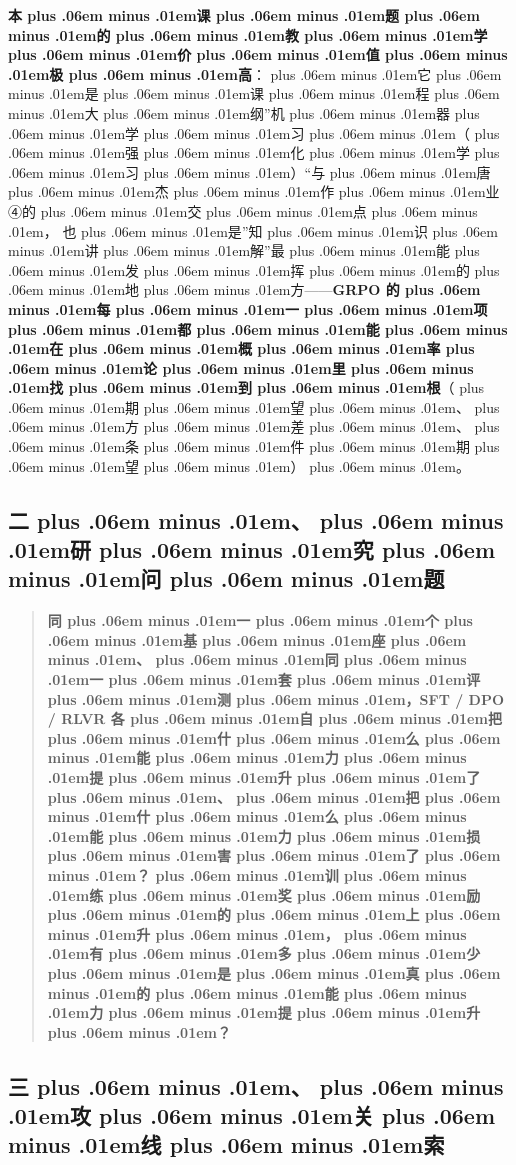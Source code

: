 \documentclass[
]{article}
\def\zh#1{{\zhfont #1}}
\def\sym#1{{\symfont #1}}
\def\zhglue{\hskip0pt plus .06em minus .01em}
\begin{document}
\textbf{\zh{本\zhglue 课\zhglue 题\zhglue 的\zhglue 教\zhglue 学\zhglue 价\zhglue 值\zhglue 极\zhglue 高}}\zh{：\zhglue 它\zhglue 是\zhglue 课\zhglue 程\zhglue 大\zhglue 纲}''\zh{机\zhglue 器\zhglue 学\zhglue 习\zhglue （\zhglue 强\zhglue 化\zhglue 学\zhglue 习\zhglue ）}``\zh{与\zhglue 唐\zhglue 杰\zhglue 作\zhglue 业}\sym{④}\zh{的\zhglue 交\zhglue 点\zhglue ，} \zh{也\zhglue 是}''\zh{知\zhglue 识\zhglue 讲\zhglue 解}''\zh{最\zhglue 能\zhglue 发\zhglue 挥\zhglue 的\zhglue 地\zhglue 方}------\textbf{GRPO \zh{的\zhglue 每\zhglue 一\zhglue 项\zhglue 都\zhglue 能\zhglue 在\zhglue 概\zhglue 率\zhglue 论\zhglue 里\zhglue 找\zhglue 到\zhglue 根}}\zh{（\zhglue 期\zhglue 望\zhglue 、\zhglue 方\zhglue 差\zhglue 、\zhglue 条\zhglue 件\zhglue 期\zhglue 望\zhglue ）\zhglue 。}

\subsection{\zh{二\zhglue 、\zhglue 研\zhglue 究\zhglue 问\zhglue 题}}\label{ux4e8cux7814ux7a76ux95eeux9898}

\begin{quote}
\textbf{\zh{同\zhglue 一\zhglue 个\zhglue 基\zhglue 座\zhglue 、\zhglue 同\zhglue 一\zhglue 套\zhglue 评\zhglue 测\zhglue ，}SFT / DPO / RLVR \zh{各\zhglue 自\zhglue 把\zhglue 什\zhglue 么\zhglue 能\zhglue 力\zhglue 提\zhglue 升\zhglue 了\zhglue 、\zhglue 把\zhglue 什\zhglue 么\zhglue 能\zhglue 力\zhglue 损\zhglue 害\zhglue 了\zhglue ？\zhglue 训\zhglue 练\zhglue 奖\zhglue 励\zhglue 的\zhglue 上\zhglue 升\zhglue ，\zhglue 有\zhglue 多\zhglue 少\zhglue 是\zhglue 真\zhglue 的\zhglue 能\zhglue 力\zhglue 提\zhglue 升\zhglue ？}}
\end{quote}

\subsection{\zh{三\zhglue 、\zhglue 攻\zhglue 关\zhglue 线\zhglue 索}}\label{ux4e09ux653bux5173ux7ebfux7d22}
\end{document}
